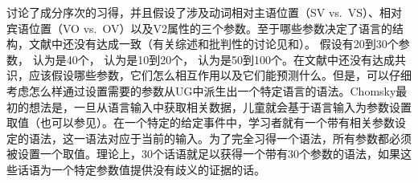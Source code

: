  \citet{GW94a}讨论了成分序次的习得，并且假设了涉及动词相对主语位置（SV vs.\ VS）、相对宾语位置（VO vs.\ OV）以及V2属性的三个参数。至于哪些参数决定了语言的结构，文献中还没有达成一致（有关综述和批判性的讨论见\citealp[\S~3.2]{Newmeyer2005a}和\citealp{Haspelmath2008a}）。 \citet[--347]{Fodor98a}假设有20到30个参数， \citet[]{GW94a}认为是40个， \citet[]{Baker2003b}认为是10到20个，  \citet[]{RH2005a}认为是50到100个。在文献中还没有达成共识，应该假设哪些参数，它们怎么相互作用以及它们能预测什么。但是，可以仔细考虑怎么样通过设置需要的参数从UG中派生出一个特定语言的语法。Chomsky最初的想法\citeyearpar[Section~3.5.1]{Chomsky86}是，一旦从语言输入中获取相关数据，儿童就会基于语言输入为参数设置取值（也可以参见\citealp*{GW94a,NKN2001a}）。在一个特定的给定事件中，学习者就有一个带有相关参数设定的语法，这一语法对应于当前的输入。为了完全习得一个语法，所有参数都必须被设置一个取值。理论上，30个话语就足以获得一个带有30个参数的语法，如果这些话语为一个特定参数值提供没有歧义的证据的话。

